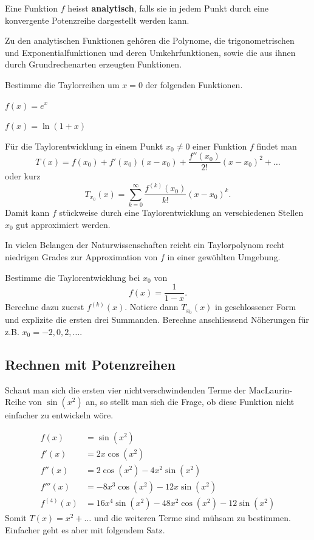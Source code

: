 \documentclass[%
11pt,%
twoside,%
titlepage,%
german,%
headsepline%
]{scrartcl}
\begin{document}
\begin{defn}
Eine Funktion $f$ heisst \textbf{analytisch}, falls sie in jedem Punkt durch eine konvergente Potenzreihe dargestellt werden kann.
\end{defn}
Zu den analytischen Funktionen geh\"oren die Polynome, die trigonometrischen und Exponentialfunktionen und deren Umkehrfunktionen, sowie die aus ihnen durch Grundrechenarten erzeugten Funktionen.
\begin{ueb}
Bestimme die Taylorreihen um $x=0$ der folgenden Funktionen.
\begin{enumeratea}
\item $f(x)=e^x$
\item $f(x)=\ln(1+x)$
\end{enumeratea}
\end{ueb}
F\"ur die Taylorentwicklung in einem Punkt $x_0\neq0$ einer Funktion $f$ findet man
$$T(x)=f(x_0)+f'(x_0)(x-x_0)+\frac{f''(x_0)}{2!}(x-x_0)^2+\dots$$
oder kurz
$$T_{x_0}(x)=\sum_{k=0}^\infty \frac{f^{(k)}(x_0)}{k!}(x-x_0)^k.$$
Damit kann $f$ st\"uckweise durch eine Taylorentwicklung an verschiedenen Stellen $x_0$ gut approximiert werden.
\begin{bem}
In vielen Belangen der Naturwissenschaften reicht ein Taylorpolynom recht niedrigen Grades zur Approximation von $f$ in einer gew\"ohlten Umgebung.
\end{bem} 

\begin{ueb}
Bestimme die Taylorentwicklung bei $x_0$ von
$$f(x)=\frac{1}{1-x}.$$
Berechne dazu zuerst $f^{(k)}(x)$. Notiere dann $T_{x_0}(x)$ in geschlossener Form und explizite die ersten drei Summanden. Berechne anschliessend N\"oherungen f\"ur z.B. $x_0=-2,0,2,\dots$.
\end{ueb}

\subsection{Rechnen mit Potenzreihen}

Schaut man sich die ersten vier nichtverschwindenden Terme der MacLaurin-Reihe von $\sin(x^2)$ an, so stellt man sich die Frage, ob diese Funktion nicht einfacher zu entwickeln w\"ore.

\begin{align*}
f(x) &= \sin(x^2) \\
f'(x) &= 2x\cos(x^2) \\
f''(x) &= 2\cos(x^2)-4x^2\sin(x^2) \\
f'''(x) &= -8x^3\cos(x^2)-12x\sin(x^2) \\
f^{(4)}(x) &= 16x^4\sin(x^2)-48x^2\cos(x^2)-12\sin(x^2)
\end{align*}
Somit $T(x)=x^2+\dots$ und die weiteren Terme sind m\"uhsam zu bestimmen. Einfacher geht es aber mit folgendem Satz.
\end{document}
